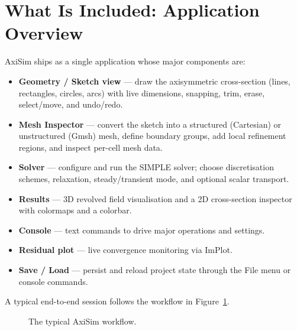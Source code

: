 \documentclass[11pt]{article}
\begin{document}
\section{What Is Included: Application Overview}
AxiSim ships as a single application whose major components are:
\begin{itemize}[nosep]
  \item \textbf{Geometry / Sketch view} --- draw the axisymmetric cross-section
        (lines, rectangles, circles, arcs) with live dimensions, snapping, trim,
        erase, select/move, and undo/redo.
  \item \textbf{Mesh Inspector} --- convert the sketch into a structured (Cartesian)
        or unstructured (Gmsh) mesh, define boundary groups, add local refinement
        regions, and inspect per-cell mesh data.
  \item \textbf{Solver} --- configure and run the SIMPLE solver; choose discretisation
        schemes, relaxation, steady/transient mode, and optional scalar transport.
  \item \textbf{Results} --- 3D revolved field visualisation and a 2D cross-section
        inspector with colormaps and a colorbar.
  \item \textbf{Console} --- text commands to drive major operations and settings.
  \item \textbf{Residual plot} --- live convergence monitoring via ImPlot.
  \item \textbf{Save / Load} --- persist and reload project state through the File
        menu or console commands.
\end{itemize}

A typical end-to-end session follows the workflow in Figure~\ref{fig:workflow}.

\begin{figure}[h]
\centering
{}
\caption{The typical AxiSim workflow.}
\label{fig:workflow}
\end{figure}
\end{document}
